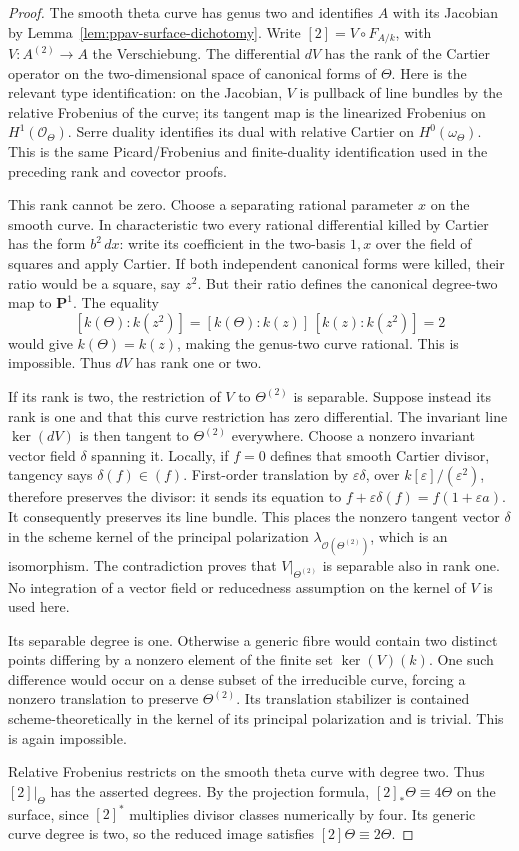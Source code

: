 \begin{proof}
The smooth theta curve has genus two and identifies $A$
with its Jacobian by Lemma~\ref{lem:ppav-surface-dichotomy}.
Write $[2]=V\circ F_{A/k}$, with
$V:A^{(2)}\to A$ the Verschiebung.
The differential $dV$ has the rank of the Cartier operator
on the two-dimensional space of canonical forms of $\Theta$.
Here is the relevant type identification: on the Jacobian,
$V$ is pullback of line bundles by the relative Frobenius
of the curve; its tangent map is the linearized Frobenius
on $H^1(\mathcal O_\Theta)$. Serre duality identifies its
dual with relative Cartier on $H^0(\omega_\Theta)$.
This is the same Picard/Frobenius and finite-duality
identification used in the preceding rank and covector
proofs.

This rank cannot be zero. Choose a separating rational
parameter $x$ on the smooth curve. In characteristic two
every rational differential killed by Cartier has the
form $b^2\,dx$: write its coefficient in the two-basis
$1,x$ over the field of squares and apply Cartier.
If both independent canonical forms were killed, their
ratio would be a square, say $z^2$. But their ratio
defines the canonical degree-two map to $\mathbf P^1$.
The equality
\[
 [k(\Theta):k(z^2)]
       =[k(\Theta):k(z)]\,[k(z):k(z^2)]=2
\]
would give $k(\Theta)=k(z)$, making the genus-two curve
rational. This is impossible. Thus $dV$ has rank one or
two.

If its rank is two, the restriction of $V$ to
$\Theta^{(2)}$ is separable. Suppose instead its rank is
one and that this curve restriction has zero differential.
The invariant line $\ker(dV)$ is then tangent to
$\Theta^{(2)}$ everywhere. Choose a nonzero invariant
vector field $\delta$ spanning it. Locally, if $f=0$
defines that smooth Cartier divisor, tangency says
$\delta(f)\in(f)$. First-order translation by
$\varepsilon\delta$, over $k[\varepsilon]/(\varepsilon^2)$,
therefore preserves the divisor: it sends its equation to
$f+\varepsilon\delta(f)=f(1+\varepsilon a)$.
It consequently preserves its line bundle. This places
the nonzero tangent vector $\delta$ in the scheme kernel
of the principal polarization
$\lambda_{\mathcal O(\Theta^{(2)})}$, which is an
isomorphism. The contradiction proves that
$V|_{\Theta^{(2)}}$ is separable also in rank one.
No integration of a vector field or reducedness assumption
on the kernel of $V$ is used here.

Its separable degree is one. Otherwise a generic fibre
would contain two distinct points differing by a nonzero
element of the finite set $\ker(V)(k)$. One such difference
would occur on a dense subset of the irreducible curve,
forcing a nonzero translation to preserve
$\Theta^{(2)}$. Its translation stabilizer is contained
scheme-theoretically in the kernel of its principal
polarization and is trivial. This is again impossible.

Relative Frobenius restricts on the smooth theta curve
with degree two. Thus $[2]|_\Theta$ has the asserted
degrees. By the projection formula,
$[2]_*\Theta\equiv4\Theta$ on the surface, since
$[2]^*$ multiplies divisor classes numerically by four.
Its generic curve degree is two, so the reduced image
satisfies $[2]\Theta\equiv2\Theta$.
\end{proof}

